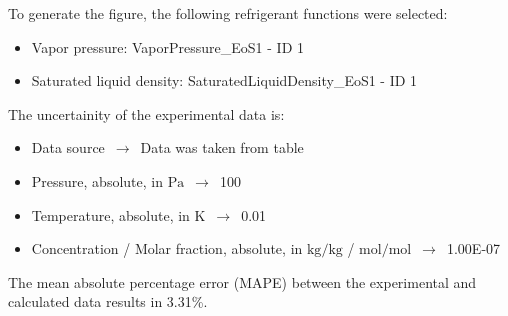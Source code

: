 To generate the figure, the following refrigerant functions were selected:
\begin{itemize}
\item Vapor pressure: VaporPressure\_EoS1 - ID 1
\item Saturated liquid density: SaturatedLiquidDensity\_EoS1 - ID 1
\end{itemize}

The uncertainity of the experimental data is:
\begin{itemize}
\item Data source $\,\to\,$ Data was taken from table
\item Pressure, absolute, in $\si{\pascal}$ $\,\to\,$ 100
\item Temperature, absolute, in $\si{\kelvin}$ $\,\to\,$ 0.01
\item Concentration / Molar fraction, absolute, in $\si{\kilogram\per\kilogram}$ / $\si{\mole\per\mole}$ $\,\to\,$ 1.00E-07
\end{itemize}

The mean absolute percentage error (MAPE) between the experimental and calculated data results in 3.31\%.
\FloatBarrier
\newpage
